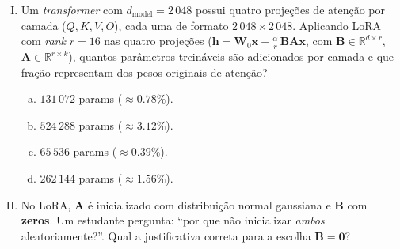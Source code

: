 \documentclass{dlproblemset}
\begin{document}
\begin{enumerate}[I)]
\begin{enumerate}[a)]
    \item PPO $\approx 114$ \texttt{GB}, DPO $\approx 114$ \texttt{GB} (economia $\approx 0$).
    \item PPO $\approx 56$ \texttt{GB}, DPO $\approx 28$ \texttt{GB} (economia $\approx 28$ \texttt{GB}).
    \item PPO $\approx 156$ \texttt{GB}, DPO $\approx 128$ \texttt{GB} (economia $\approx 28$ \texttt{GB}).
    \item PPO $\approx 28$ \texttt{GB}, DPO $\approx 14$ \texttt{GB} (economia $\approx 14$ \texttt{GB}).
\end{enumerate}

\item Um \textit{transformer} com $d_{\text{model}} = 2\,048$ possui quatro
      projeções de atenção por camada ($Q, K, V, O$), cada uma de formato
      $2\,048 \times 2\,048$. Aplicando LoRA com \textit{rank} $r = 16$ nas
      quatro projeções ($\mathbf{h} = \mathbf{W}_0 \mathbf{x} + \tfrac{\alpha}{r}\,\mathbf{B} \mathbf{A} \mathbf{x}$, com
      $\mathbf{B} \in \mathbb{R}^{d \times r}$, $\mathbf{A} \in \mathbb{R}^{r \times k}$),
      quantos parâmetros treináveis são adicionados por camada e que
      fração representam dos pesos originais de atenção?

\begin{enumerate}[a)]
    \item $131\,072$ params ($\approx 0.78\%$).
    \item $524\,288$ params ($\approx 3.12\%$).
    \item $65\,536$ params ($\approx 0.39\%$).
    \item $262\,144$ params ($\approx 1.56\%$).
\end{enumerate}

\item No LoRA, $\mathbf{A}$ é inicializado com distribuição normal gaussiana e
      $\mathbf{B}$ com \textbf{zeros}. Um estudante pergunta: ``por que não
      inicializar \emph{ambos} aleatoriamente?''. Qual a justificativa
      correta para a escolha $\mathbf{B} = \mathbf{0}$?


\end{enumerate}
\end{document}
